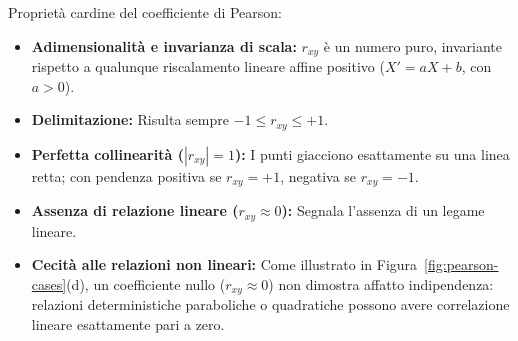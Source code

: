 Propriet\`a cardine del coefficiente di Pearson:
\begin{itemize}
    \item \textbf{Adimensionalit\`a e invarianza di scala:} $r_{xy}$ \`e un numero puro, invariante rispetto a qualunque riscalamento lineare affine positivo ($X' = aX + b$, con $a > 0$).
    \item \textbf{Delimitazione:} Risulta sempre $-1 \le r_{xy} \le +1$.
    \item \textbf{Perfetta collinearit\`a ($|r_{xy}| = 1$):} I punti giacciono esattamente su una linea retta; con pendenza positiva se $r_{xy} = +1$, negativa se $r_{xy} = -1$.
    \item \textbf{Assenza di relazione lineare ($r_{xy} \approx 0$):} Segnala l'assenza di un legame lineare.
    \item \textbf{Cecit\`a alle relazioni non lineari:} Come illustrato in Figura~\ref{fig:pearson-cases}(d), un coefficiente nullo ($r_{xy} \approx 0$) non dimostra affatto indipendenza: relazioni deterministiche paraboliche o quadratiche possono avere correlazione lineare esattamente pari a zero.
\end{itemize}

